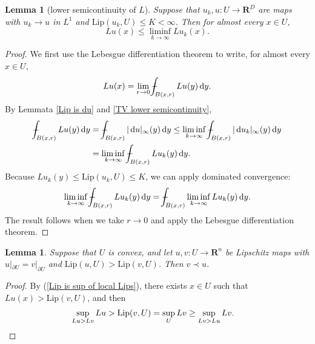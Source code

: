 \documentclass[reqno,11pt]{amsart}
\newcommand{\RR}{\mathbf{R}}
\newcommand*\dif{\mathop{}\!\mathrm{d}}
\DeclareMathOperator{\dist}{dist}
\DeclareMathOperator{\len}{len}
\newcommand{\Lip}{\mathrm{Lip}}
\newcommand{\dfn}[1]{\emph{#1}\index{#1}}
\newtheorem{lemma}[theorem]{Lemma}
\theoremstyle{definition}
\numberwithin{equation}{section}
\def\Xint#1{\mathchoice
{\XXint\displaystyle\textstyle{#1}}%
{\XXint\textstyle\scriptstyle{#1}}%
{\XXint\scriptstyle\scriptscriptstyle{#1}}%
{\XXint\scriptscriptstyle\scriptscriptstyle{#1}}%
\!\int}
\def\XXint#1#2#3{{\setbox0=\hbox{$#1{#2#3}{\int}$ }
\vcenter{\hbox{$#2#3$ }}\kern-.6\wd0}}
\def\dashint{\Xint-}
\begin{document}
\begin{lemma}[lower semicontinuity of $L$]\label{Lip is lower semicontinuous}
Suppose that $u_k, u: U \to \RR^D$ are maps with $u_k \to u$ in $L^1$ and $\Lip(u_k, U) \leq K < \infty$.
Then for almost every $x \in U$,
$$Lu(x) \leq \liminf_{k \to \infty} Lu_k(x).$$
\end{lemma}
\begin{proof} 
We first use the Lebesgue differentiation theorem to write, for almost every $x \in U$,
$$Lu(x) = \lim_{r \to 0} \dashint_{B(x, r)} Lu(y) \dif y.$$
By Lemmata \ref{Lip is du} and \ref{TV lower semicontinuity},
\begin{align*}
\dashint_{B(x, r)} Lu(y) \dif y 
&= \dashint_{B(x, r)} |\dif u|_\infty(y) \dif y 
\leq \liminf_{k \to \infty} \dashint_{B(x, r)} |\dif u_k|_\infty(y) \dif y \\
&= \liminf_{k \to \infty} \dashint_{B(x, r)} Lu_k(y) \dif y.
\end{align*}
Because $Lu_k(y) \leq \Lip(u_k, U) \leq K$, we can apply dominated convergence:
$$\liminf_{k \to \infty} \dashint_{B(x, r)} Lu_k(y) \dif y = \dashint_{B(x, r)} \liminf_{k \to \infty} Lu_k(y) \dif y.$$
The result follows when we take $r \to 0$ and apply the Lebesgue differentiation theorem.
\end{proof}

\begin{lemma}\label{tight implies best lipschitz}
Suppose that $U$ is convex, and let $u, v: U \to \RR^n$ be Lipschitz maps with $u|_{\partial U} = v|_{\partial U}$ and $\Lip(u, U) > \Lip(v, U)$.
Then $v \prec u$.
\end{lemma}
\begin{proof}
By (\ref{Lip is sup of local Lips}), there exists $x \in U$ such that $Lu(x) > \Lip(v, U)$, and then
\begin{align*}
\sup_{Lu > Lv} Lu &> \Lip(v, U) = \sup_U Lv \geq \sup_{Lv > Lu} Lv. \qedhere
\end{align*}
\end{proof}


\end{document}
